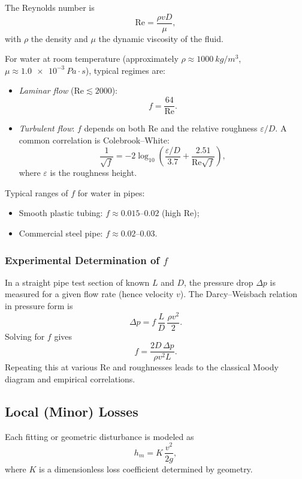 \documentclass[11pt]{article}
\begin{document}
The Reynolds number is
\[
\mathrm{Re} = \frac{\rho v D}{\mu},
\]
with $\rho$ the density and $\mu$ the dynamic viscosity of the fluid.

For water at room temperature (approximately $\rho \approx
\SI{1000}{kg/m^3}$, $\mu \approx \SI{1.0e-3}{Pa\cdot s}$), typical regimes are:
\begin{itemize}
  \item \emph{Laminar flow} ($\mathrm{Re} \lesssim 2000$):
        \[
        f = \frac{64}{\mathrm{Re}}.
        \]
  \item \emph{Turbulent flow}: $f$ depends on both $\mathrm{Re}$ and the
        relative roughness $\varepsilon/D$. A common correlation is
        Colebrook--White:
        \[
        \frac{1}{\sqrt{f}}
        = -2\log_{10}\left(
            \frac{\varepsilon/D}{3.7}
            + \frac{2.51}{\mathrm{Re}\sqrt{f}}
          \right),
        \]
        where $\varepsilon$ is the roughness height.
\end{itemize}

Typical ranges of $f$ for water in pipes:
\begin{itemize}
  \item Smooth plastic tubing: $f \approx 0.015$--$0.02$ (high $\mathrm{Re}$);
  \item Commercial steel pipe: $f \approx 0.02$--$0.03$.
\end{itemize}

\subsubsection*{Experimental Determination of $f$}

In a straight pipe test section of known $L$ and $D$, the pressure drop
$\Delta p$ is measured for a given flow rate (hence velocity $v$). The
Darcy--Weisbach relation in pressure form is
\[
\Delta p = f\,\frac{L}{D}\,\frac{\rho v^2}{2}.
\]
Solving for $f$ gives
\[
f = \frac{2D\,\Delta p}{\rho v^2 L}.
\]
Repeating this at various $\mathrm{Re}$ and roughnesses leads to the classical
Moody diagram and empirical correlations.

\subsection{Local (Minor) Losses}

Each fitting or geometric disturbance is modeled as
\begin{equation}
  h_m = K\,\frac{v^2}{2g},
\end{equation}
where $K$ is a dimensionless loss coefficient determined by geometry.
\end{document}
